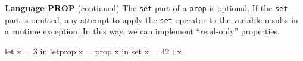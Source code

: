 \begin{minipage}[t]{\sw}
\slidenumber
\LARGE
{\bf Language PROP} (continued)\exx
The \verb'set' part of a \verb'prop' is optional.
If the \verb'set' part is omitted,
any attempt to apply the \verb'set' operator to the variable
results in a runtime exception.
In this way, we can implement ``read-only'' properties.
\Large
\begin{qv}
let
  x = 3 
in
  letprop
    x = prop x %
  in
    {set x = 42 ; x} %
\end{qv}
\end{minipage}

